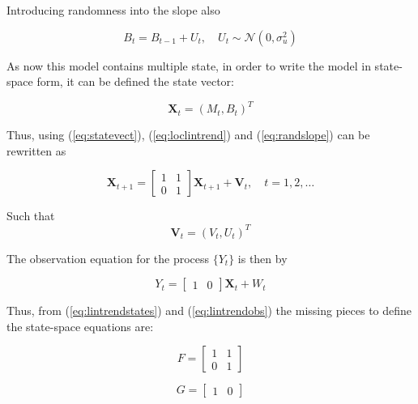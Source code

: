 Introducing randomness into the slope also

\begin{equation}
	B_t = B_{t-1} + U_t , \quad  U_t \sim \mathcal{N}(0,\sigma^2_u) \label{eq:randslope}
\end{equation} 

As now this model contains multiple state, in order to write the model in state-space form, it can be defined the state vector:

\begin{equation}
	\bm{X}_t = (M_t, B_t)^T \label{eq:statevect}
\end{equation}

Thus, using (\ref{eq:statevect}), (\ref{eq:loclintrend}) and (\ref{eq:randslope}) can be rewritten as

\begin{equation}
	\bm{X}_{t+1} = 
	\begin{bmatrix}
		1 & 1 \\
		0 & 1 
	\end{bmatrix} \bm{X}_{t+1} + \bm{V}_{t}, \quad t = 1, 2, \ldots
	\label{eq:lintrendstates}
\end{equation}

Such that 
\begin{equation}\label{eq:V_trend}
	\bm{V}_{t} = (V_t, U_t)^T
\end{equation}

The observation equation for the process $\{Y_t\}$ is then by

\begin{equation}\label{eq:lintrendobs}
	Y_t = \begin{bmatrix}1 & 0\end{bmatrix}\bm{X}_{t} + W_t
\end{equation}

Thus, from (\ref{eq:lintrendstates}) and (\ref{eq:lintrendobs}) the missing pieces to define the state-space equations are:

\begin{equation}\label{eq:F_trend}
	F = \begin{bmatrix}
		1 & 1 \\
		0 & 1 
	\end{bmatrix}
\end{equation}

\begin{equation}
  G = \begin{bmatrix}1 & 0\end{bmatrix}
\end{equation} 

